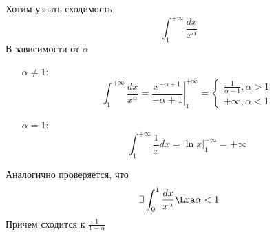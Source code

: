 \begin{example}
    Хотим узнать сходимость 
    $$\int_1^{+\infty} \frac{dx}{x^\alpha}$$
    В зависимости от $\alpha$
    \begin{enumerate}
        \item[$\alpha \ne 1$:]
        $$\int_1^{+\infty} \frac{dx}{x^\alpha} = \left. \frac{x^{-\alpha + 1}}{-\alpha + 1}\right|_1^{+\infty} = \left\{\begin{array}{l}
            \frac{1}{\alpha - 1}, \alpha > 1 \\
            +\infty, \alpha < 1
        \end{array}\right.$$
        \item[$\alpha = 1$:] 
        $$\int_1^{+\infty} \frac{1}{x}dx = \left.\ln x\right|_1^{+\infty} = +\infty$$
    \end{enumerate}
\end{example}

\begin{example}
    Аналогично проверяется, что 
    $$\exists \int_{0}^{1}\frac{dx}{x^\alpha} \Lra \alpha < 1$$
    Причем сходится к \(\frac{1}{1 - \alpha}\)
\end{example}